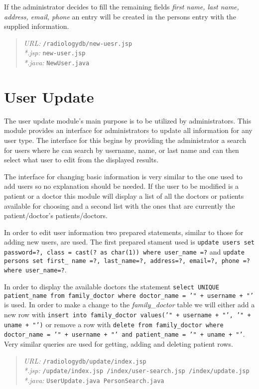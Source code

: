 \documentclass[11pt]{report}
\begin{document}
If the administrator decides to fill the remaining fields \emph{first name, last name, address, email, phone} an entry will be created in the persons entry with the supplied information.

\begin{quote}
\emph{URL:} \texttt{/radiologydb/new-uesr.jsp} \\
\emph{*.jsp: } \texttt{new-user.jsp} \\
\emph{*.java: } \texttt{NewUser.java}
\end{quote}

\section*{User Update}
The user update module's main purpose is to be utilized by administrators. This module provides an interface for administrators to update all information for any user type. The interface for this begins by providing the administrator a search for users where he can search by username, name, or last name and can then select what user to edit from the displayed results.

The interface for changing basic information is very similar to the one used to add users so no explanation should be needed. If the user to be modified is a patient or a doctor this module will display a list of all the doctors or patients available for choosing and a second list with the ones that are currently the patient/doctor's patients/doctors.

In order to edit user information two prepared statements, similar to those for adding new users, are used. The first prepared stament used is \texttt{update users set password=?, class = cast(? as char(1)) where user\_name =?} and \texttt{update persons set first\_ name =?, last\_name=?, address=?, email=?, phone =? where user\_name=?}.

In order to display the available doctors the statement \texttt{select UNIQUE patient\_name from family\_doctor where doctor\_name = '" + username + "'} is used. In order to make a change to the \emph{family\_doctor} table we will either add a new row with \texttt{insert into family\_doctor values('" + username + "', '" + uname + "')} or remove a row with \texttt{delete from family\_doctor where doctor\_name = '" + username + "' and patient\_name = '" + uname + "'}. Very similar queries are used for getting, adding and deleting patient rows.

\begin{quote}
\emph{URL:} \texttt{/radiologydb/update/index.jsp} \\
\emph{*.jsp: } \texttt{/update/index.jsp /index/user-search.jsp /index/update.jsp} \\
\emph{*.java: } \texttt{UserUpdate.java PersonSearch.java}
\end{quote}
\end{document}
